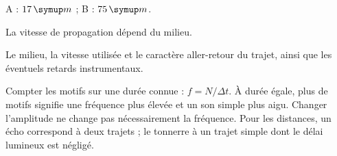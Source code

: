 \par\noindent\begin{minipage}{\linewidth}
\label{cor-defi-19}\begin{questions}
\item A : $17\unite m$ ; B : $75\unite m$.
\item La vitesse de propagation dépend du milieu.
\item Le milieu, la vitesse utilisée et le caractère aller-retour du trajet, ainsi que les éventuels retards instrumentaux.
\end{questions}
\end{minipage}
\par\noindent\begin{minipage}{\linewidth}
\label{cor-activite-19}
Compter les motifs sur une durée connue : $f=N/\Delta t$. À durée égale, plus de motifs signifie une fréquence plus élevée et un son simple plus aigu. Changer l’amplitude ne change pas nécessairement la fréquence. Pour les distances, un écho correspond à deux trajets ; le tonnerre à un trajet simple dont le délai lumineux est négligé.\par\end{minipage}
